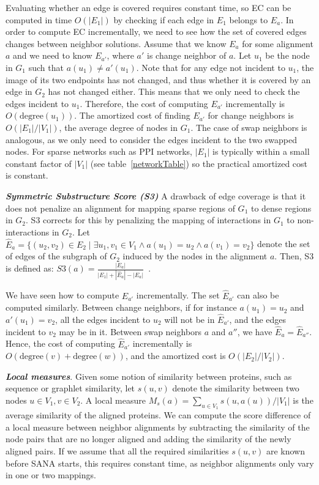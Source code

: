 \documentclass{bioinfo}
\newcommand{\Eb}{\hat{E}}
\begin{document}
\begin{methods}
Evaluating whether an edge is covered requires constant time, so EC can be computed in time $O(|E_1|)$ by checking if each edge in $E_1$ belongs to $E_a$. In order to compute EC incrementally, we need to see how the set of covered edges changes between neighbor solutions. Assume that we know $E_a$ for some alignment $a$ and we need to know $E_{a'}$, where $a'$ is change neighbor of $a$. Let $u_1$ be the node in $G_1$ such that $a(u_1)\not= a'(u_1)$. Note that for any edge not incident to $u_1$, the image of its two endpoints has not changed, and thus whether it is covered by an edge in $G_2$ has not changed either. This means that we only need to check the edges incident to $u_1$. Therefore, the cost of computing $E_{a'}$ incrementally is $O(\mbox{degree}(u_1))$. The amortized cost of finding $E_{a'}$ for change neighbors is $O(|E_1|/|V_1|)$, the average degree of nodes in $G_1$. The case of swap neighbors is analogous, as we only need to consider the edges incident to the two swapped nodes. For sparse networks such as PPI networks, $|E_1|$ is typically within a small constant factor of $|V_1|$ (see table~\ref{networkTable}) so the practical amortized cost is constant.

\emph{\textbf{Symmetric Substructure Score (S3)}} A drawback of edge coverage is that it does not penalize an alignment for mapping sparse regions of $G_1$ to dense regions in $G_2$. S3 corrects for this by penalizing the mapping of interactions in $G_1$ to non-interactions in $G_2$. Let $\Eb_a=\{(u_2,v_2)\in E_2 \mid \exists u_1,v_1 \in V_1 \wedge a(u_1)=u_2 \wedge a(v_1)=v_2\}$ denote the set of edges of the subgraph of $G_2$ induced by the nodes in the alignment $a$. Then, S3 is defined as: $S3(a)=\frac{|E_a|}{|E_1|+|\Eb_a|-|E_a|}$~\citep{MAGNA}.

We have seen how to compute $E_{a'}$ incrementally. The set $\Eb_{a'}$ can also be computed similarly. Between change neighbors, if for instance $a(u_1)=u_2$ and $a'(u_1)=v_2$, all the edges incident to $u_2$ will not be in $\Eb_{a'}$, and the edges incident to $v_2$ may be in it. Between swap neighbors $a$ and $a''$, we have $\Eb_{a}=\Eb_{a''}$. Hence, the cost of computing $\Eb_{a'}$ incrementally is $O(\mbox{degree}(v)+\mbox{degree}(w))$, and the amortized cost is $O(|E_2|/|V_2|)$.

\emph{\textbf{Local measures}}. Given some notion of similarity between proteins, such as sequence or graphlet similarity, let $s(u,v)$ denote the similarity between two nodes $u\in V_1, v\in V_2$. A local measure
$M_s(a)=\sum_{u\in V_1} s(u,a(u))/|V_1|$
is the average similarity of the aligned proteins.
We can compute the score difference of a local measure between neighbor alignments by subtracting the similarity of the node pairs that are no longer aligned and adding the similarity of the newly aligned pairs. If we assume that all the required similarities $s(u,v)$ are known before SANA starts, this requires constant time, as neighbor alignments only vary in one or two mappings.


\end{methods}
\end{document}
